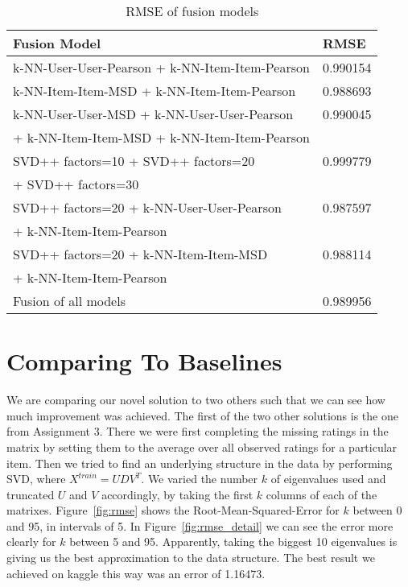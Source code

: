 \documentclass[10pt,conference,compsocconf]{IEEEtran}
\newcommand{\rfig}[1]{Figure~\ref{fig:#1}}
\begin{document}
\begin{table}
\renewcommand{\arraystretch}{1.3}
\begin{tabular}{|l|l|}
\hline
\textbf{Fusion Model}                                          & \textbf{RMSE} \\ \hline
k-NN-User-User-Pearson + k-NN-Item-Item-Pearson                & 0.990154     \\ \hline
k-NN-Item-Item-MSD + k-NN-Item-Item-Pearson                    & 0.988693     \\ \hline
k-NN-User-User-MSD + k-NN-User-User-Pearson                    & 0.990045     \\
+ k-NN-Item-Item-MSD + k-NN-Item-Item-Pearson                  &      \\ \hline
SVD++ factors=10 + SVD++ factors=20         & 0.999779     \\ 
+ SVD++ factors=30 & \\\hline
SVD++ factors=20 + k-NN-User-User-Pearson                      & 0.987597     \\
+ k-NN-Item-Item-Pearson                                       &      \\ \hline
SVD++ factors=20 + k-NN-Item-Item-MSD                          & 0.988114     \\
+ k-NN-Item-Item-Pearson                                       &  \\ \hline
Fusion of all models                                           & 0.989956     \\ \hline
\end{tabular}
\caption{RMSE of fusion models}
\label{tab:fusion}
\end{table}

\section{Comparing To Baselines}
We are comparing our novel solution to two others such that we can see how much improvement was achieved. The first of the two other solutions is the one from Assignment 3. There we were first completing the missing ratings in the matrix by setting them to the average over all observed ratings for a particular item. Then we tried to find an underlying structure in the data by performing SVD, where $X^{train} = UDV^T$. We varied the number $k$ of eigenvalues used and truncated $U$ and $V$ accordingly, by taking the first $k$ columns of each of the matrixes. \rfig{rmse} shows the Root-Mean-Squared-Error for $k$ between 0 and 95, in intervals of 5. In \rfig{rmse_detail} we can see the error more clearly for $k$ between 5 and 95. Apparently, taking the biggest 10 eigenvalues is giving us the best approximation to the data structure. The best result we achieved on kaggle this way was an error of 1.16473.
\end{document}
